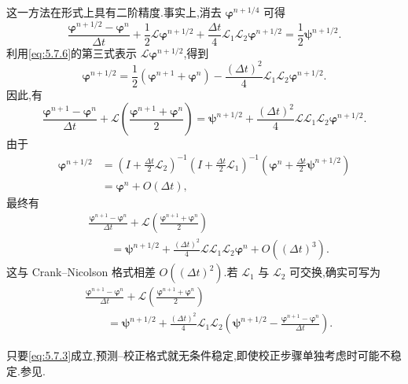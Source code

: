 这一方法在形式上具有二阶精度.事实上,消去 \(\boldsymbol{\varphi}^{n+1/4}\) 可得
\[
  \frac{\boldsymbol{\varphi}^{n+1/2}-\boldsymbol{\varphi}^n}{\Delta t}
  +\frac12\mathcal L\boldsymbol{\varphi}^{n+1/2}
  +\frac{\Delta t}4\mathcal L_1\mathcal L_2\boldsymbol{\varphi}^{n+1/2}
    =\frac12\boldsymbol{\psi}^{n+1/2}.
\]
利用\eqref{eq:5.7.6}的第三式表示 \(\mathcal L\boldsymbol{\varphi}^{n+1/2}\),得到
\[
  \boldsymbol{\varphi}^{n+1/2}
   =\frac12(\boldsymbol{\varphi}^{n+1}+\boldsymbol{\varphi}^n)
      -\frac{(\Delta t)^2}4\mathcal L_1\mathcal L_2\boldsymbol{\varphi}^{n+1/2}.
\]
因此,有
\[
  \frac{\boldsymbol{\varphi}^{n+1}-\boldsymbol{\varphi}^n}{\Delta t}
   +\mathcal L\left(\frac{\boldsymbol{\varphi}^{n+1}+\boldsymbol{\varphi}^n}{2}\right)
   =\boldsymbol{\psi}^{n+1/2}
      +\frac{(\Delta t)^2}4\mathcal L\mathcal L_1\mathcal L_2\boldsymbol{\varphi}^{n+1/2}.
\]
由于
\[
  \begin{aligned}
    \boldsymbol{\varphi}^{n+1/2}
    &=\left(I+\frac{\Delta t}2\mathcal L_2\right)^{-1}
      \left(I+\frac{\Delta t}2\mathcal L_1\right)^{-1}
      \left(\boldsymbol{\varphi}^n+\frac{\Delta t}2\boldsymbol{\psi}^{n+1/2}\right)\\
    &=\boldsymbol{\varphi}^n+O(\Delta t),
  \end{aligned}
\]
最终有
\[
  \begin{aligned}
    &\frac{\boldsymbol{\varphi}^{n+1}-\boldsymbol{\varphi}^n}{\Delta t}
       +\mathcal L\left(\frac{\boldsymbol{\varphi}^{n+1}+\boldsymbol{\varphi}^n}{2}\right)\\
    &\qquad=\boldsymbol{\psi}^{n+1/2}
       +\frac{(\Delta t)^2}4\mathcal L\mathcal L_1\mathcal L_2\boldsymbol{\varphi}^n
       +O((\Delta t)^3).
  \end{aligned}
\]
这与 Crank--Nicolson 格式相差 \(O((\Delta t)^2)\).若 \(\mathcal L_1\) 与 \(\mathcal L_2\) 可交换,确实可写为
\[
  \begin{aligned}
    &\frac{\boldsymbol{\varphi}^{n+1}-\boldsymbol{\varphi}^n}{\Delta t}
       +\mathcal L\left(\frac{\boldsymbol{\varphi}^{n+1}+\boldsymbol{\varphi}^n}{2}\right)\\
    &\qquad=\boldsymbol{\psi}^{n+1/2}
       +\frac{(\Delta t)^2}4\mathcal L_1\mathcal L_2
        \left(\boldsymbol{\psi}^{n+1/2}
           -\frac{\boldsymbol{\varphi}^{n+1}-\boldsymbol{\varphi}^n}{\Delta t}\right).
  \end{aligned}
\]

只要\eqref{eq:5.7.3}成立,预测--校正格式就无条件稳定,即使校正步骤单独考虑时可能不稳定.参见.


